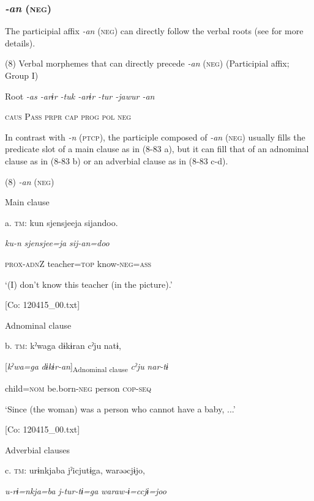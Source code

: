 \subsubsection{\textit{{}-an} (\textsc{neg})}

The participial affix \textit{{}-an} (\textsc{neg}) can directly follow the verbal roots (see  for more details).

(8)  Verbal morphemes that can directly precede \textit{{}-an} (\textsc{neg}) (Participial affix; Group I)

  Root  \textit{{}-as  {}-arɨr  {}-tuk  {}-arɨr  {}-tur  {}-jawur  {}-an}

    \textsc{caus}  P\textsc{ass}  \textsc{prpr}  \textsc{cap}  \textsc{prog}  \textsc{pol}  \textsc{neg}

In contrast with \textit{{}-n} (\textsc{ptcp}), the participle composed of \textit{{}-an} (\textsc{neg}) usually fills the predicate slot of a main clause as in (8-83 a), but it can fill that of an adnominal clause as in (8-83 b) or an adverbial clause as in (8-83 c-d).

(8)  \textit{{}-an} (\textsc{neg})

  Main clause

  a.  \textsc{tm}:  kun  {\textbar}sjensjee{\textbar}ja  sijandoo.

      \textit{ku-n}  \textit{sjensjee=ja}  \textit{sij-an=doo}

      \textsc{prox}-\textsc{adn}Z  teacher=\textsc{top}  know-\textsc{neg}=\textsc{ass}

      ‘(I) don’t know this teacher (in the picture).’

      [Co: 120415\_00.txt]

  Adnominal clause

  b.  \textsc{tm}:  kˀwaga  dɨkɨran  cˀju  natɨ,

      [\textit{kˀwa=ga}  \textit{dɨkɨr-an}]\textsubscript{Adnominal clause}  \textit{cˀju}  \textit{nar-tɨ}

      child=\textsc{nom}  be.born-\textsc{neg}  person  \textsc{cop}-\textsc{seq}

      ‘Since (the woman) was a person who cannot have a baby, ...’

      [Co: 120415\_00.txt]

  Adverbial clauses

  c.  \textsc{tm}:  urɨnkjaba  jˀicjutɨga,  warəəcjɨjo,

      \textit{u-rɨ=nkja=ba}  \textit{j-tur-tɨ=ga}  \textit{waraw-ɨ=ccjɨ=joo}

